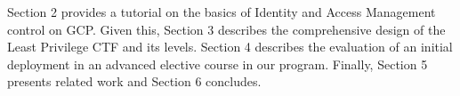 
Section 2 provides a tutorial on the basics of Identity and Access Management control on
GCP. Given this, Section 3 describes the comprehensive design of the Least Privilege CTF and its levels. Section 4 describes the evaluation of an initial deployment in an advanced elective course in our program.  Finally, Section 5 presents related work and Section 6 concludes.